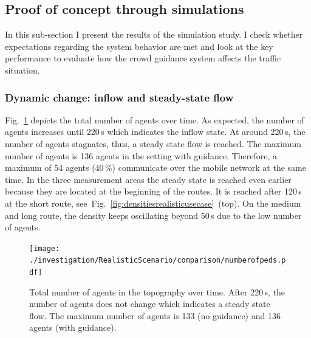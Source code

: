 \subsection{Proof of concept through simulations}
In this sub-section I present the results of the simulation study. I check whether expectations regarding the system behavior are met and look at the key performance to evaluate how the crowd guidance system affects the traffic situation.


\subsubsection{Dynamic change: inflow and steady-state flow}

Fig.~\ref{fig:realistisceNumberofPeds} depicts the total number of agents over time. As expected, the number of agents increases until 220\,s which indicates the inflow state. At around 220\,s, the number of agents stagnates, thus, a steady state flow is reached. The maximum number of agents is 136 agents in the setting with guidance. Therefore, a maximum of 54 agents (40\,\%) communicate over the mobile network at the same time. In the three measurement areas the steady state is reached even earlier because they are located at the beginning of the routes. It is reached after 120\,s at the short route, see~Fig.~\ref{fig:densitiesrealisticusecase}~(top). On the medium and long route, the density keeps oscillating beyond 50\,s due to the low number of agents. 

\begin{figure}[hbt!]
\texttt{[image: ./investigation/RealisticScenario/comparison/numberofpeds.pdf]} 
\caption[Number of agents over time]{Total number of agents in the topography over time. After 220\,s, the number of agents does not change which indicates a steady state flow. The maximum number of agents is 133 (no guidance) and 136 agents (with guidance).}
\label{fig:realistisceNumberofPeds}
\end{figure}




